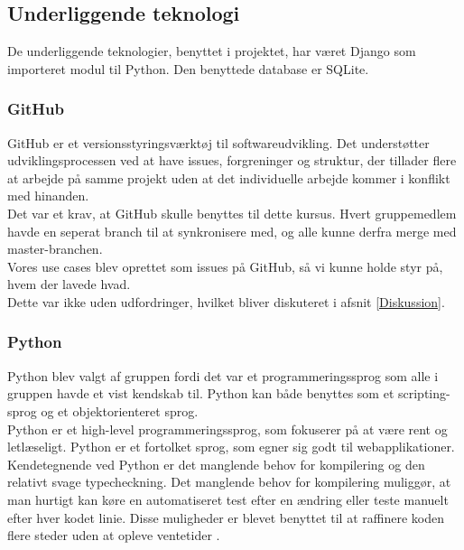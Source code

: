 \documentclass[]{article}
\begin{document}
\subsection{Underliggende teknologi}
De underliggende teknologier, benyttet i projektet, har været Django som importeret modul til Python. Den benyttede database er SQLite. %
\subsubsection{GitHub}
\noindent GitHub er et versionsstyringsværktøj til softwareudvikling. Det understøtter udviklingsprocessen ved at have issues, forgreninger og struktur, der tillader flere at arbejde på samme projekt uden at det individuelle arbejde kommer i konflikt med hinanden. \\
Det var et krav, at GitHub skulle benyttes til dette kursus. Hvert gruppemedlem havde en seperat branch til at synkronisere med, og alle kunne derfra merge med master-branchen. \\
Vores use cases blev oprettet som issues på GitHub, så vi kunne holde styr på, hvem der lavede hvad. \\ Dette var ikke uden udfordringer, hvilket bliver diskuteret i afsnit \ref{Diskussion}.
\subsubsection{Python}
\noindent Python blev valgt af gruppen fordi det var et programmeringssprog som alle i gruppen havde et vist kendskab til. Python kan både benyttes som et scripting-sprog og et objektorienteret sprog. \\
Python er et high-level programmeringssprog, som fokuserer på at være rent og letlæseligt. Python er et fortolket sprog, som egner sig godt til webapplikationer. \\
Kendetegnende ved Python er det manglende behov for kompilering og den relativt svage typecheckning. Det manglende behov for kompilering muliggør, at man hurtigt kan køre en automatiseret test efter en ændring eller teste manuelt efter hver kodet linie. Disse muligheder er blevet benyttet til at raffinere koden flere steder uden at opleve ventetider \cite{martin2006agile,mcconnell2004code}.
\end{document}
